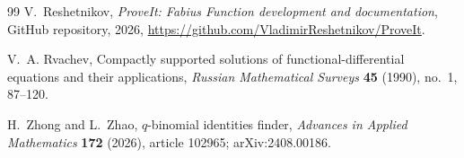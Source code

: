 \documentclass[11pt,a4paper,oneside,openany]{book}
\theoremstyle{definition}
\theoremstyle{remark}
\begin{document}
\begin{thebibliography}{99}
V.~Reshetnikov,
\emph{ProveIt: Fabius Function development and documentation},
GitHub repository, 2026,
\url{https://github.com/VladimirReshetnikov/ProveIt}.

V.~A. Rvachev,
Compactly supported solutions of functional-differential equations and their applications,
\emph{Russian Mathematical Surveys} \textbf{45} (1990), no.~1, 87--120.

H.~Zhong and L.~Zhao,
$q$-binomial identities finder,
\emph{Advances in Applied Mathematics} \textbf{172} (2026), article 102965;
arXiv:2408.00186.

\end{thebibliography}

\printindex
\end{document}
